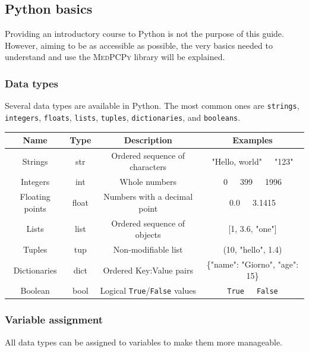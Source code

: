\documentclass[a4paper,12pt]{article}
\begin{document}
\subsection{Python basics}

Providing an introductory course to Python is not the purpose of this guide. However, aiming to be as accessible as possible, the very basics needed to understand and use the {\scshape MedPCPy} library will be explained.

\subsubsection{Data types}

Several data types are available in Python. The most common ones are \verb|strings|, \verb|integers|, \verb|floats|, \verb|lists|, \verb|tuples|, \verb|dictionaries|, and \verb|booleans|.

\vspace{5mm}
\noindent\begin{tabular}{|c|c|c|c|}
    \hline
    {\bfseries Name}&{\bfseries Type}&{\bfseries Description}&{\bfseries Examples}\\
    \hline
    Strings&str&Ordered sequence of characters&"Hello, world"\ \ \ "123"\\
    \hline
    Integers&int&Whole numbers&0\ \ \ 399\ \ \ 1996\\
    \hline
    Floating points&float&Numbers with a decimal point&0.0\ \ \ 3.1415\\
    \hline
    Lists&list&Ordered sequence of objects&[1, 3.6, "one"]\\
    \hline
    Tuples&tup&Non-modifiable list&(10, "hello", 1.4)\\
    \hline
    Dictionaries&dict&Ordered Key:Value pairs&\{"name": "Giorno", "age": 15\}\\
    \hline
    Boolean&bool&Logical \verb|True|/\verb|False| values&\verb|True|\ \ \ \verb|False|\\
    \hline
\end{tabular}

\vspace{5mm}
\subsubsection{Variable assignment}

All data types can be assigned to variables to make them more manageable.
\end{document}
